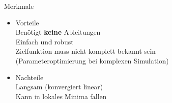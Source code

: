 \documentclass[\outputformat]{beamer}
\begin{document}
\begin{frame}{Merkmale}
	\begin{itemize}
		\pause\item Vorteile\\
			\qquad Benötigt \textbf{keine} Ableitungen\\
			\qquad Einfach und robust\\
			\qquad Zielfunktion muss nicht komplett bekannt sein \\
			\qquad (Parameteroptimierung bei komplexen Simulation)
			
	\end{itemize}
	\begin{itemize}
		\pause\item Nachteile\\
			\qquad Langsam (konvergiert linear)\\
			\qquad Kann in lokales Minima fallen\\
	\end{itemize}

	    
\end{frame}
\end{document}
